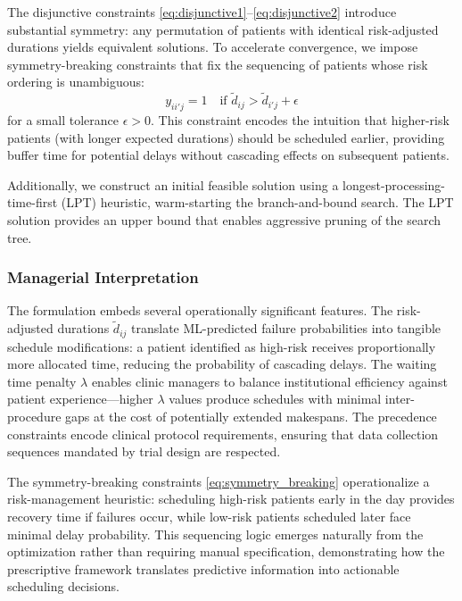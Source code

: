The disjunctive constraints \eqref{eq:disjunctive1}--\eqref{eq:disjunctive2} introduce substantial symmetry: any permutation of patients with identical risk-adjusted durations yields equivalent solutions. To accelerate convergence, we impose symmetry-breaking constraints that fix the sequencing of patients whose risk ordering is unambiguous:
\begin{equation}
y_{ii'j} = 1 \quad \text{if } \tilde{d}_{ij} > \tilde{d}_{i'j} + \epsilon
\label{eq:symmetry_breaking}
\end{equation}
for a small tolerance $\epsilon > 0$. This constraint encodes the intuition that higher-risk patients (with longer expected durations) should be scheduled earlier, providing buffer time for potential delays without cascading effects on subsequent patients.

Additionally, we construct an initial feasible solution using a longest-processing-time-first (LPT) heuristic, warm-starting the branch-and-bound search. The LPT solution provides an upper bound that enables aggressive pruning of the search tree.

\subsubsection{Managerial Interpretation}

The formulation embeds several operationally significant features. The risk-adjusted durations $\tilde{d}_{ij}$ translate ML-predicted failure probabilities into tangible schedule modifications: a patient identified as high-risk receives proportionally more allocated time, reducing the probability of cascading delays. The waiting time penalty $\lambda$ enables clinic managers to balance institutional efficiency against patient experience---higher $\lambda$ values produce schedules with minimal inter-procedure gaps at the cost of potentially extended makespans. The precedence constraints encode clinical protocol requirements, ensuring that data collection sequences mandated by trial design are respected.

The symmetry-breaking constraints \eqref{eq:symmetry_breaking} operationalize a risk-management heuristic: scheduling high-risk patients early in the day provides recovery time if failures occur, while low-risk patients scheduled later face minimal delay probability. This sequencing logic emerges naturally from the optimization rather than requiring manual specification, demonstrating how the prescriptive framework translates predictive information into actionable scheduling decisions.

